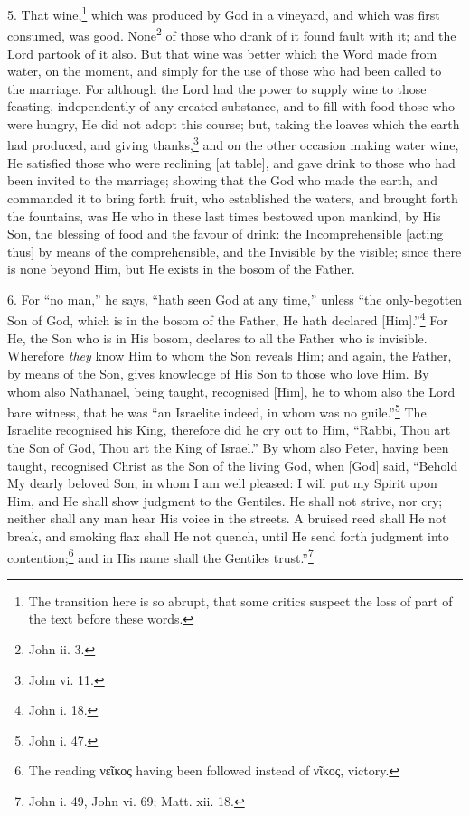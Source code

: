 5. That wine,\footnote{The transition here is so abrupt, that some critics suspect the loss of part of the text before these words.} which was produced by God in a vineyard, and which was first consumed, was good. None\footnote{John ii. 3.} of those who drank of it found fault with it; and the Lord partook of it also. But that wine was better which the Word made from water, on the moment, and simply for the use of those who had been called to the marriage. For although the Lord had the power to supply wine to those feasting, independently of any created substance, and to fill with food those who were hungry, He did not adopt this course; but, taking the loaves which the earth had produced, and giving thanks,\footnote{John vi. 11.} and on the other occasion making water wine, He satisfied those who were reclining [at table], and gave drink to those who had been invited to the marriage; showing that the God who made the earth, and commanded it to bring forth fruit, who established the waters, and brought forth the fountains, was He who in these last times bestowed upon mankind, by His Son, the blessing of food and the favour of drink: the Incomprehensible [acting thus] by means of the comprehensible, and the Invisible by the visible; since there is none beyond Him, but He exists in the bosom of the Father.

6. For “no man,” he says, “hath seen God at any time,” unless “the only-begotten Son of God, which is in the bosom of the Father, He hath declared [Him].”\footnote{John i. 18.} For He, the Son who is in His bosom, declares to all the Father who is invisible. Wherefore \emph{they} know Him to whom the Son reveals Him; and again, the Father, by means of the Son, gives knowledge of His Son to those who love Him. By whom also Nathanael, being taught, recognised [Him], he to whom also the Lord bare witness, that he was “an Israelite indeed, in whom was no guile.”\footnote{John i. 47.} The  Israelite recognised his King, therefore did he cry out to Him, “Rabbi, Thou art the Son of God, Thou art the King of Israel.” By whom also Peter, having been taught, recognised Christ as the Son of the living God, when [God] said, “Behold My dearly beloved Son, in whom I am well pleased: I will put my Spirit upon Him, and He shall show judgment to the Gentiles. He shall not strive, nor cry; neither shall any man hear His voice in the streets. A bruised reed shall He not break, and smoking flax shall He not quench, until He send forth judgment into contention;\footnote{The reading \textgreek{νεῖκος} having been followed instead of \textgreek{νῖκος}, victory.} and in His name shall the Gentiles trust.”\footnote{John i. 49, John vi. 69; Matt. xii. 18.}

